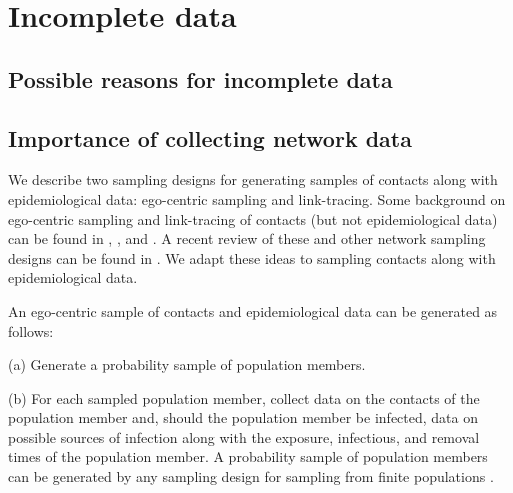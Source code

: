 \documentclass[12pt,usenatbib,referee]{article}
\renewcommand{\alert}{\textcolor{black}}
\begin{document}
\alert{}

\section{Incomplete data}
\label{importance}

\alert{}

\vspace{-.25cm}

\subsection{Possible reasons for incomplete data}
\label{data.issue}

\alert{}

\vspace{-.35cm}

\subsection{Importance of collecting network data}
\label{sample.networks}

\alert{}

We describe two sampling designs for generating samples of contacts along with epidemiological data:
ego-centric sampling and link-tracing.
Some background on ego-centric sampling and link-tracing of contacts (but not epidemiological data) can be found in 
\citet{ThFr00}, 
\citet{HaGi09},
and \citet{KrMo17}.
\alert{}A recent review of these and other network sampling designs can be found in \citet[][]{ScKrBu17}.
We adapt these ideas to sampling contacts along with epidemiological data.

An ego-centric sample of contacts and epidemiological data can be generated as follows:
\bi
\item[(a)] Generate a probability sample of population members.
\item[(b)] For each sampled population member,
collect data on the contacts of the population member and,
should the population member be infected,
data on possible sources of infection along with the exposure, infectious, and removal times of the population member.
\ei
A probability sample of population members can be generated by any sampling design for sampling from finite populations \citep[e.g.,][]{Th12}.
\end{document}
